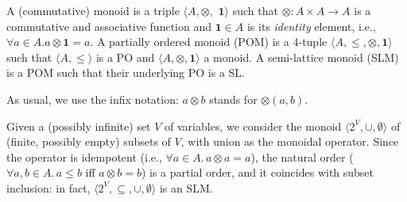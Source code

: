 \documentclass{llncs}
\def\1{{\mathbf 1}}
\newcommand{\comment}[1]{}
\def\1{{\mathbf 1}}
\def\monop{\otimes}
\begin{document}


%
%

\begin{definition}\label{defn:clm}
	A (commutative) monoid is a triple
	$\langle A, \monop,$ $\1 \rangle$ such that $\monop: A \times A \rightarrow A$ is
	a commutative and associative function and $\1 \in A$ is its \emph{identity} element,
	i.e., $\forall a \in A. a \monop \1 = a$.
%	
	A partially ordered monoid (POM) is a 4-tuple
	$\langle A, \leq, \monop, \1 \rangle$ such that 	
	$\langle A, \leq \rangle$ is a PO and $\langle A, \monop, \1 \rangle$ a monoid.
	A semi-lattice monoid (SLM) is a 
	POM such that their underlying PO is a SL.
\end{definition}

As usual, we use the infix notation: $a \monop b$ stands for $\monop(a,b)$.
\comment{The monoidal operator can be defined for any multi-set: it is given 
for a family of elements $a_i \in A$ indexed over a non-empty finite
set $I$, and it is denoted by
$\bigotimes_{i \in I} a_i$.
%
If for an index set $I$ the $a_i$'s are different,
we write $\bigotimes S$ instead of $\bigotimes_{i \in I} a_i$
for the set $S = \{a_i \mid i \in I\}$.
%
Conventionally, we denote $\bigotimes \emptyset = \bot$.
}

\begin{example}\label{ex:powerset}
	Given a (possibly infinite) set $V$ of variables, we consider
	the monoid $\langle 2^V, \cup, \emptyset \rangle$
	of (finite, possibly empty) subsets of $V$, with union as the monoidal operator.
	Since the operator is idempotent (i.e., $\forall a\in A.\, a \monop a = a$), 
	the natural order ($\forall a, b \in A.\, a \leq b$ iff $a \monop b = b$) 
	is a partial order, and 
	it coincides with subset inclusion:
	in fact, $\langle 2^V, \subseteq, \cup, \emptyset \rangle$
	is an SLM.
\end{example}
\end{document}
